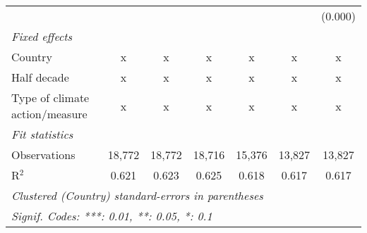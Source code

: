 \begin{tabular}{lcccccc}
                                                       &             &         &              &                &                & (0.000)\\   
   \emph{Fixed effects}\\
   Country                                             & x           & x       & x            & x              & x              & x\\  
   Half decade                                         & x           & x       & x            & x              & x              & x\\  
   Type of climate action/measure                      & x           & x       & x            & x              & x              & x\\  
   \midrule \emph{Fit statistics}\\
   Observations                                        & 18,772      & 18,772  & 18,716       & 15,376         & 13,827         & 13,827\\  
   R$^2$                                               & 0.621       & 0.623   & 0.625        & 0.618          & 0.617          & 0.617\\  
   \midrule
   \multicolumn{7}{l}{\emph{Clustered (Country) standard-errors in parentheses}}\\
   \multicolumn{7}{l}{\emph{Signif. Codes: ***: 0.01, **: 0.05, *: 0.1}}\\
\end{tabular}
\par\endgroup


